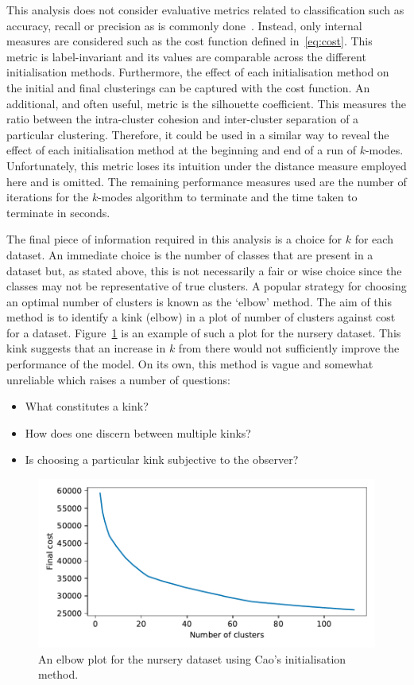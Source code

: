 This analysis does not consider evaluative metrics related to classification
such as accuracy, recall or precision as is commonly done~\cite{%
    Arthur2007,Cao2009,Cao2012,Huang1998,%
    Ng2007,Olaode2014,Schaeffer2007,Sharma2015%
}. Instead, only internal measures are considered such as the cost function
defined in~\eqref{eq:cost}. This metric is label-invariant and its values are
comparable across the different initialisation methods. Furthermore, the effect
of each initialisation method on the initial and final clusterings can be
captured with the cost function. An additional, and often useful, metric is the
silhouette coefficient. This measures the ratio between the intra-cluster
cohesion and inter-cluster separation of a particular clustering. Therefore, it
could be used in a similar way to reveal the effect of each initialisation
method at the beginning and end of a run of \(k\)-modes. Unfortunately, this
metric loses its intuition under the distance measure employed here and is
omitted. The remaining performance measures used are the number of iterations
for the \(k\)-modes algorithm to terminate and the time taken to terminate in
seconds.

The final piece of information required in this analysis is a choice for \(k\)
for each dataset. An immediate choice is the number of classes that are present
in a dataset but, as stated above, this is not necessarily a fair or wise choice
since the classes may not be representative of true clusters. A popular strategy
for choosing an optimal number of clusters is known as the `elbow' method. The
aim of this method is to identify a kink (elbow) in a plot of number of clusters
against cost for a dataset. Figure~\ref{fig:nursery_costs} is an example of such
a plot for the nursery dataset. This kink suggests that an increase in \(k\)
from there would not sufficiently improve the performance of the model. On its
own, this method is vague and somewhat unreliable which raises a number of
questions:
\begin{itemize}
    \item What constitutes a kink?
    \item How does one discern between multiple kinks?
    \item Is choosing a particular kink subjective to the observer?
\end{itemize}

\begin{figure}
    \centering
    \includegraphics[width=.8\linewidth]{./img/elbow/nursery_costs.pdf}
    \caption{An elbow plot for the nursery dataset using Cao's initialisation
             method.}\label{fig:nursery_costs}
\end{figure}


